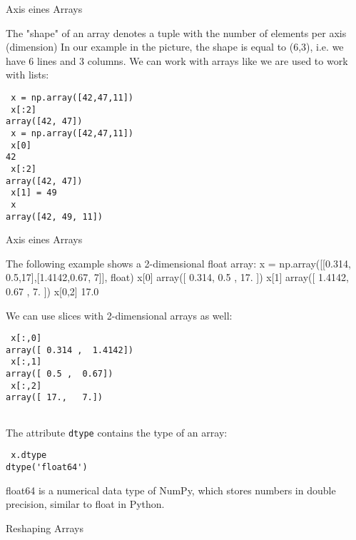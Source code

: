 Axis eines Arrays

The "shape" of an array denotes a tuple with the number of elements per axis (dimension) In our example in the picture, the shape is equal to (6,3), i.e. we have 6 lines and 3 columns. 
We can work with arrays like we are used to work with lists: 

\begin{framed}
\begin{verbatim}
 x = np.array([42,47,11])
 x[:2]
array([42, 47])
 x = np.array([42,47,11])
 x[0]
42
 x[:2]
array([42, 47])
 x[1] = 49
 x
array([42, 49, 11])

\end{verbatim}
\end{framed}
Axis eines Arrays

The following example shows a 2-dimensional float array:
 x = np.array([[0.314, 0.5,17],[1.4142,0.67, 7]], float)
 x[0]
array([  0.314,   0.5  ,  17.   ])
 x[1]
array([ 1.4142,  0.67  ,  7.    ])
 x[0,2]
17.0


We can use slices with 2-dimensional arrays as well:
\begin{framed}
\begin{verbatim}
 x[:,0]
array([ 0.314 ,  1.4142])
 x[:,1]
array([ 0.5 ,  0.67])
 x[:,2]
array([ 17.,   7.])
 
\end{verbatim}
\end{framed}

The attribute \texttt{dtype} contains the type of an array:
\begin{framed}
\begin{verbatim}
 x.dtype
dtype('float64')
\end{verbatim}
\end{framed}
float64 is a numerical data type of NumPy, which stores numbers in double precision, similar to float in Python.

Reshaping Arrays


